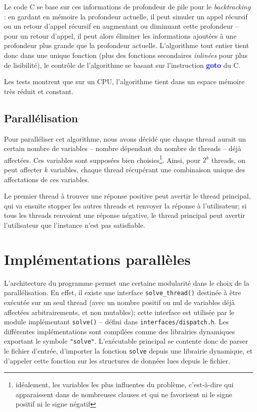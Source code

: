 \documentclass{article}
\newcommand{\keyword}[1]{\textbf{\textcolor{blue}{#1}}}
\newcommand{\code}[1]{\texttt{{#1}}}
\begin{document}
Le code C se base sur ces informations de profondeur de pile pour le \emph{backtracking} : en gardant en mémoire la profondeur actuelle, il peut simuler un appel récursif ou un retour d'appel récursif en augmentant ou diminuant cette profondeur -- pour un retour d'appel, il peut alors éliminer les informations ajoutées à une profondeur plus grande que la profondeur actuelle. L'algorithme tout entier tient donc dans une unique fonction (plus des fonctions secondaires \emph{inlinées} pour plus de lisibilité), le contrôle de l'algorithme se basant sur l'instruction \keyword{goto} du C.

Les tests montrent que sur un \textsc{CPU}, l'algorithme tient dans un espace mémoire très réduit et constant.


\subsection{Parallélisation}
    Pour paralléliser cet algorithme, nous avons décidé que chaque thread aurait un certain nombre de variables -- nombre dépendant du nombre de threads -- déjà affectées. Ces variables sont supposées bien choisies\footnote{idéalement, les variables les plus \og influentes \fg du problème, c'est-à-dire qui apparaissent dans de nombreuses clauses et qui ne favorisent ni le signe positif ni le signe négatif}. Ainsi, pour $2^{k}$ threads, on peut affecter $k$ variables, chaque thread récupérant une combinaison unique des affectations de ces variables.

    Le premier thread à trouver une réponse positive peut avertir le thread principal, qui va ensuite stopper les autres threads et renvoyer la réponse à l'utilisateur; si tous les threads renvoient une réponse négative, le thread principal peut avertir l'utilisateur que l'instance n'est pas satisfiable.


\section{Implémentations parallèles}
    L'architecture du programme permet une certaine modularité dans le choix de la parallélisation. En effet, il existe une interface \code{solve\_thread()} destinée à être exécutée sur un seul thread (avec un nombre positif ou nul de variables déjà affectées arbitrairements, et non mutables); cette interface est utilisée par le module implémentant \code{solve()} -- défini dans \texttt{interfaces/dispatch.h}. Les différentes implémentations sont compilées comme des librairies dynamiques exportant le symbole \code{"solve"}. L'exécutable principal se contente donc de parser le fichier d'entrée, d'importer la fonction \code{solve} depuis une librairie dynamique, et d'appeler cette fonction sur les structures de données lues depuis le fichier.
\end{document}
